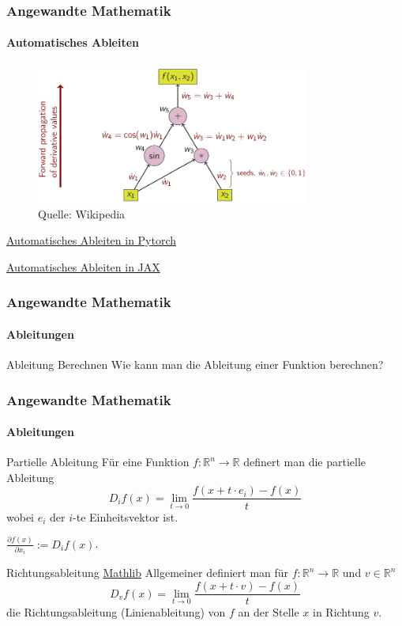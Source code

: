 \documentclass{beamer}
\begin{document}
\begin{frame}
    \frametitle{Angewandte Mathematik}
\framesubtitle{Automatisches Ableiten}
\begin{figure}[H]
      \centering
    \includegraphics[width=0.8\textwidth]{images/ad.png}
      \caption{Quelle: Wikipedia}
\end{figure}

\href{https://pytorch.org/tutorials/beginner/blitz/autograd_tutorial.html}{Automatisches Ableiten  in Pytorch}

\href{https://jax.readthedocs.io/en/latest/notebooks/quickstart.html}{Automatisches Ableiten  in JAX}

 \end{frame}



    \begin{frame}
        \frametitle{Angewandte Mathematik}
        \framesubtitle{Ableitungen}
        \begin{block}{Ableitung Berechnen}
            Wie kann man die Ableitung einer Funktion berechnen?
        \end{block}
    
    \end{frame}




    \begin{frame}
        \frametitle{Angewandte Mathematik}
        \framesubtitle{Ableitungen}  
        \begin{block}{Partielle Ableitung}
            Für eine Funktion $f: \mathbb{R}^n \to \mathbb{R}$ definert man die partielle Ableitung 
            \[
                D_i f (x) = \lim_{t \to 0} \frac{f(x + t \cdot e_i) - f(x)}{t}
                \]
            wobei \( e_i \) der \( i \)-te Einheitsvektor ist. 
           
            \( \frac{\partial f(x)}{\partial x_i} :=  D_i f (x)\).
            
        \end{block}

        \begin{block}{Richtungsableitung \href{https://github.com/leanprover-community/mathlib4/blob/f4f0b47a2f859d27e965c812344deb1435fe8d48/Mathlib/Analysis/Calculus/LineDeriv/Basic.lean\#L69-L70}{Mathlib}}
            Allgemeiner definiert man für $f: \mathbb{R}^n \to \mathbb{R}$ und  $v \in \mathbb{R}^n$
            \[
                D_v f (x) = \lim_{t \to 0} \frac{f(x + t \cdot v) - f(x)}{t}
                \]
            die Richtungsableitung (Linienableitung) von $f$ an der Stelle $x$ in Richtung $v$.            
        \end{block}
    \end{frame}
\end{document}
